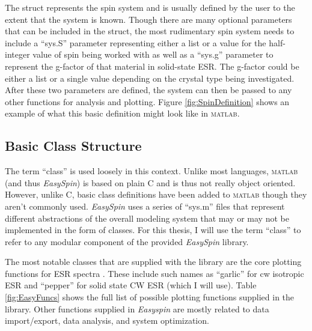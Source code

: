 \documentclass[oneside]{BYUPhys}
\begin{document}
The struct represents the spin system and is usually defined by the user to the extent that the system is known. Though there are many optional parameters that can be included in the struct, the most rudimentary spin system needs to include a ``sys.S'' parameter representing either a list or a value for the half-integer value of spin being worked with as well as a ``sys.g'' parameter to represent the g-factor of that material in solid-state ESR. The g-factor could be either a list or a single value depending on the crystal type being investigated. After these two parameters are defined, the system can then be passed to any other functions for analysis and plotting. Figure \ref{fig:SpinDefinition} shows an example of what this basic definition might look like in \textsc{matlab}.

\subsection{Basic Class Structure}

The term ``class'' is used loosely in this context. Unlike most languages, \textsc{matlab} (and thus \textit{EasySpin}) is based on plain C and is thus not really object oriented. However, unlike C, basic class definitions have been added to \textsc{matlab} though they aren't commonly used. \textit{EasySpin} uses a series of ``sys.m'' files that represent different abstractions of the overall modeling system that may or may not be implemented in the form of classes. For this thesis, I will use the term ``class'' to refer to any modular component of the provided \textit{EasySpin} library.

The most notable classes that are supplied with the library are the core plotting functions for ESR spectra \cite{RefWorks:doc:589299f4e4b0d4c09201f915}. These include such names as ``garlic'' for cw isotropic ESR and ``pepper'' for solid state CW ESR (which I will use). Table \ref{fig:EasyFuncs} shows the full list of possible plotting functions supplied in the library. Other functions supplied in \textit{Easyspin} are mostly related to data import/export, data analysis, and system optimization.
\end{document}
